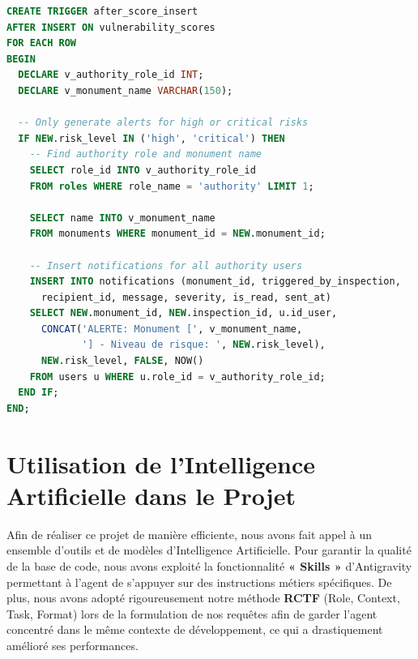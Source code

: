 \documentclass[12pt,a4paper]{article}
\begin{document}
\begin{lstlisting}[language=SQL, caption=Trigger after\_score\_insert - Notifications automatiques]
CREATE TRIGGER after_score_insert
AFTER INSERT ON vulnerability_scores
FOR EACH ROW
BEGIN
  DECLARE v_authority_role_id INT;
  DECLARE v_monument_name VARCHAR(150);

  -- Only generate alerts for high or critical risks
  IF NEW.risk_level IN ('high', 'critical') THEN
    -- Find authority role and monument name
    SELECT role_id INTO v_authority_role_id
    FROM roles WHERE role_name = 'authority' LIMIT 1;

    SELECT name INTO v_monument_name
    FROM monuments WHERE monument_id = NEW.monument_id;

    -- Insert notifications for all authority users
    INSERT INTO notifications (monument_id, triggered_by_inspection,
      recipient_id, message, severity, is_read, sent_at)
    SELECT NEW.monument_id, NEW.inspection_id, u.id_user,
      CONCAT('ALERTE: Monument [', v_monument_name,
             '] - Niveau de risque: ', NEW.risk_level),
      NEW.risk_level, FALSE, NOW()
    FROM users u WHERE u.role_id = v_authority_role_id;
  END IF;
END;
\end{lstlisting}

\clearpage
\section{Utilisation de l'Intelligence Artificielle dans le Projet}

Afin de réaliser ce projet de manière efficiente, nous avons fait appel à un ensemble d'outils et de modèles d'Intelligence Artificielle. Pour garantir la qualité de la base de code, nous avons exploité la fonctionnalité \textbf{« Skills »} d'Antigravity permettant à l'agent de s'appuyer sur des instructions métiers spécifiques. De plus, nous avons adopté rigoureusement notre méthode \textbf{RCTF} (Role, Context, Task, Format) lors de la formulation de nos requêtes afin de garder l'agent concentré dans le même contexte de développement, ce qui a drastiquement amélioré ses performances.
\end{document}
